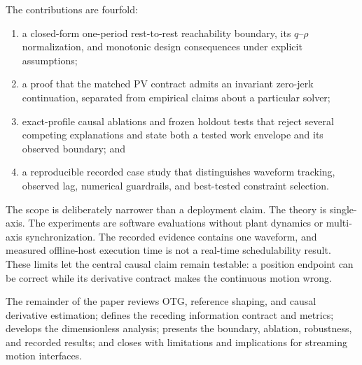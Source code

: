 The contributions are fourfold:
\begin{enumerate}[leftmargin=*,itemsep=2pt]
  \item a closed-form one-period rest-to-rest reachability boundary, its $q$--$\rho$ normalization, and monotonic design consequences under explicit assumptions;
  \item a proof that the matched PV contract admits an invariant zero-jerk continuation, separated from empirical claims about a particular solver;
  \item exact-profile causal ablations and frozen holdout tests that reject several competing explanations and state both a tested work envelope and its observed boundary; and
  \item a reproducible recorded case study that distinguishes waveform tracking, observed lag, numerical guardrails, and best-tested constraint selection.
\end{enumerate}

The scope is deliberately narrower than a deployment claim. The theory is single-axis. The experiments are software evaluations without plant dynamics or multi-axis synchronization. The recorded evidence contains one waveform, and measured offline-host execution time is not a real-time schedulability result. These limits let the central causal claim remain testable: a position endpoint can be correct while its derivative contract makes the continuous motion wrong.

The remainder of the paper reviews OTG, reference shaping, and causal derivative estimation; defines the receding information contract and metrics; develops the dimensionless analysis; presents the boundary, ablation, robustness, and recorded results; and closes with limitations and implications for streaming motion interfaces.

